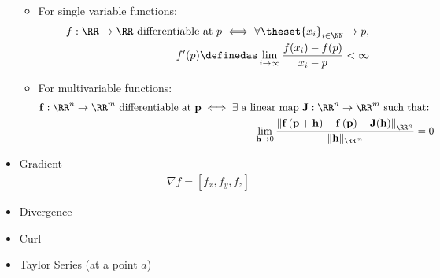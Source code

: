 \begin{itemize}
  \begin{itemize}
  \item
    For single variable functions:
    \begin{align*}
      f:\RR \to \RR ~\text{differentiable at } p \iff
      \forall \theset{x_i}_{i\in \NN}\to p,\\
      f'(p) \definedas \lim_{i\to\infty} \frac{f(x_i) - f(p)}{x_i - p}< \infty
      \end{align*}
  \item
    For multivariable functions:
    \begin{align*}
      \mathbf{f}:\RR^n \to \RR^m ~\text{differentiable at } \mathbf{p} \iff \exists \text{ a linear map } \mathbf{J}:\RR^n \to \RR^m \text{ such that: } \\ \lim _ { \mathbf{h} \rightarrow 0 } \frac { \left\| \mathbf { f } \left( \mathbf{p} + \mathbf { h } \right) - \mathbf { f } \left( \mathbf { p } \right) - \mathbf { J } ( \mathbf { h } ) \right\|_ {\RR^n}} { \| \mathbf { h } \|_ {\RR^m} } = 0
      \end{align*}
  \end{itemize}
\item
  Gradient
  \begin{align*}
  \nabla f = [f_x, f_y, f_z]
  \end{align*}
\item
  Divergence
\item
  Curl
\item
  Taylor Series (at a point \(a\))


\end{itemize}

